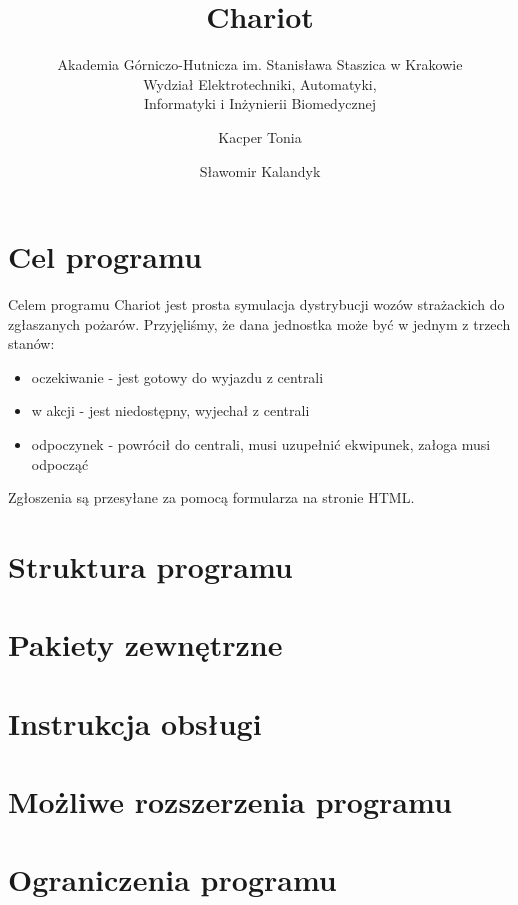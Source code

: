 \documentclass{article}
\title{Chariot}
\subtitle{Akademia Górniczo-Hutnicza im. Stanisława Staszica w Krakowie\\
	Wydział Elektrotechniki, Automatyki,\\
	Informatyki i Inżynierii Biomedycznej}
\author{Kacper Tonia\and
		Sławomir Kalandyk}
\date{}
\begin{document}
\maketitle

\section{Cel programu}
Celem programu Chariot jest prosta symulacja dystrybucji wozów strażackich do zgłaszanych pożarów. Przyjęliśmy, że dana jednostka może być w jednym z trzech stanów:
\begin{itemize}
	\item oczekiwanie - jest gotowy do wyjazdu z centrali
	\item w akcji - jest niedostępny, wyjechał z centrali
	\item odpoczynek - powrócił do centrali, musi uzupełnić ekwipunek, załoga musi odpocząć
\end{itemize}

Zgłoszenia są przesyłane za pomocą formularza na stronie HTML.

\section{Struktura programu}

\section{Pakiety zewnętrzne}

\section{Instrukcja obsługi}

\section{Możliwe rozszerzenia programu}

\section{Ograniczenia programu}
\end{document}

